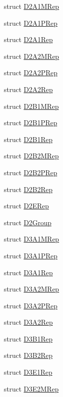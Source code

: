 \begin{DoxyCompactItemize}
struct \mbox{\hyperlink{structHadron_1_1D2A1MRep}{D2\+A1\+M\+Rep}}
\item 
struct \mbox{\hyperlink{structHadron_1_1D2A1PRep}{D2\+A1\+P\+Rep}}
\item 
struct \mbox{\hyperlink{structHadron_1_1D2A1Rep}{D2\+A1\+Rep}}
\item 
struct \mbox{\hyperlink{structHadron_1_1D2A2MRep}{D2\+A2\+M\+Rep}}
\item 
struct \mbox{\hyperlink{structHadron_1_1D2A2PRep}{D2\+A2\+P\+Rep}}
\item 
struct \mbox{\hyperlink{structHadron_1_1D2A2Rep}{D2\+A2\+Rep}}
\item 
struct \mbox{\hyperlink{structHadron_1_1D2B1MRep}{D2\+B1\+M\+Rep}}
\item 
struct \mbox{\hyperlink{structHadron_1_1D2B1PRep}{D2\+B1\+P\+Rep}}
\item 
struct \mbox{\hyperlink{structHadron_1_1D2B1Rep}{D2\+B1\+Rep}}
\item 
struct \mbox{\hyperlink{structHadron_1_1D2B2MRep}{D2\+B2\+M\+Rep}}
\item 
struct \mbox{\hyperlink{structHadron_1_1D2B2PRep}{D2\+B2\+P\+Rep}}
\item 
struct \mbox{\hyperlink{structHadron_1_1D2B2Rep}{D2\+B2\+Rep}}
\item 
struct \mbox{\hyperlink{structHadron_1_1D2ERep}{D2\+E\+Rep}}
\item 
struct \mbox{\hyperlink{structHadron_1_1D2Group}{D2\+Group}}
\item 
struct \mbox{\hyperlink{structHadron_1_1D3A1MRep}{D3\+A1\+M\+Rep}}
\item 
struct \mbox{\hyperlink{structHadron_1_1D3A1PRep}{D3\+A1\+P\+Rep}}
\item 
struct \mbox{\hyperlink{structHadron_1_1D3A1Rep}{D3\+A1\+Rep}}
\item 
struct \mbox{\hyperlink{structHadron_1_1D3A2MRep}{D3\+A2\+M\+Rep}}
\item 
struct \mbox{\hyperlink{structHadron_1_1D3A2PRep}{D3\+A2\+P\+Rep}}
\item 
struct \mbox{\hyperlink{structHadron_1_1D3A2Rep}{D3\+A2\+Rep}}
\item 
struct \mbox{\hyperlink{structHadron_1_1D3B1Rep}{D3\+B1\+Rep}}
\item 
struct \mbox{\hyperlink{structHadron_1_1D3B2Rep}{D3\+B2\+Rep}}
\item 
struct \mbox{\hyperlink{structHadron_1_1D3E1Rep}{D3\+E1\+Rep}}
\item 
struct \mbox{\hyperlink{structHadron_1_1D3E2MRep}{D3\+E2\+M\+Rep}}

\end{DoxyCompactItemize}
